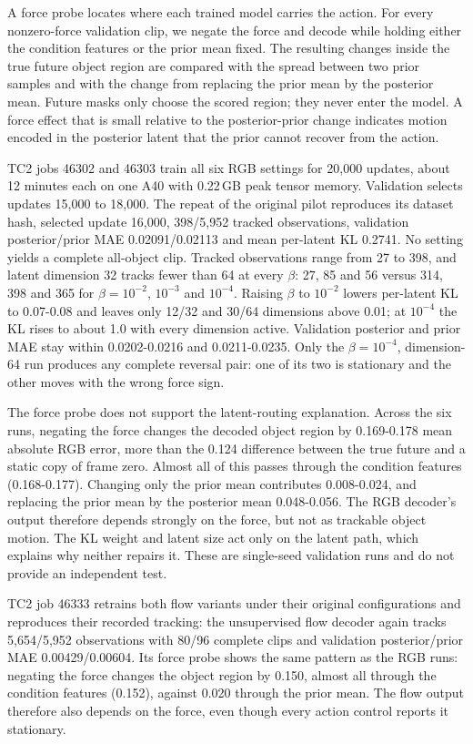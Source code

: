 \documentclass[11pt,a4paper]{article}
\begin{document}
A force probe locates where each trained model carries the action. For every nonzero-force validation clip, we negate the force and decode while holding either the condition features or the prior mean fixed. The resulting changes inside the true future object region are compared with the spread between two prior samples and with the change from replacing the prior mean by the posterior mean. Future masks only choose the scored region; they never enter the model. A force effect that is small relative to the posterior-prior change indicates motion encoded in the posterior latent that the prior cannot recover from the action.

TC2 jobs 46302 and 46303 train all six RGB settings for 20,000 updates, about 12 minutes each on one A40 with 0.22\,GB peak tensor memory. Validation selects updates 15,000 to 18,000. The repeat of the original pilot reproduces its dataset hash, selected update 16,000, 398/5,952 tracked observations, validation posterior/prior MAE 0.02091/0.02113 and mean per-latent KL 0.2741. No setting yields a complete all-object clip. Tracked observations range from 27 to 398, and latent dimension 32 tracks fewer than 64 at every $\beta$: 27, 85 and 56 versus 314, 398 and 365 for $\beta=10^{-2}$, $10^{-3}$ and $10^{-4}$. Raising $\beta$ to $10^{-2}$ lowers per-latent KL to 0.07-0.08 and leaves only 12/32 and 30/64 dimensions above 0.01; at $10^{-4}$ the KL rises to about 1.0 with every dimension active. Validation posterior and prior MAE stay within 0.0202-0.0216 and 0.0211-0.0235. Only the $\beta=10^{-4}$, dimension-64 run produces any complete reversal pair: one of its two is stationary and the other moves with the wrong force sign.

The force probe does not support the latent-routing explanation. Across the six runs, negating the force changes the decoded object region by 0.169-0.178 mean absolute RGB error, more than the 0.124 difference between the true future and a static copy of frame zero. Almost all of this passes through the condition features (0.168-0.177). Changing only the prior mean contributes 0.008-0.024, and replacing the prior mean by the posterior mean 0.048-0.056. The RGB decoder's output therefore depends strongly on the force, but not as trackable object motion. The KL weight and latent size act only on the latent path, which explains why neither repairs it. These are single-seed validation runs and do not provide an independent test.

TC2 job 46333 retrains both flow variants under their original configurations and reproduces their recorded tracking: the unsupervised flow decoder again tracks 5,654/5,952 observations with 80/96 complete clips and validation posterior/prior MAE 0.00429/0.00604. Its force probe shows the same pattern as the RGB runs: negating the force changes the object region by 0.150, almost all through the condition features (0.152), against 0.020 through the prior mean. The flow output therefore also depends on the force, even though every action control reports it stationary.
\end{document}
